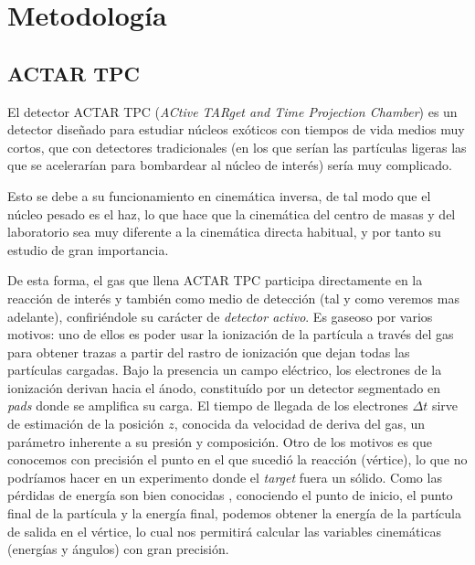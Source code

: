 \section{Metodología}


\subsection{ACTAR TPC}

El detector ACTAR TPC (\textit{ACtive TARget and Time Projection Chamber}) es un detector diseñado para estudiar núcleos exóticos con tiempos de vida medios muy cortos, que con detectores tradicionales (en los que serían las partículas ligeras las que se acelerarían para bombardear al núcleo de interés) sería muy complicado.

Esto se debe a su funcionamiento en cinemática inversa, de tal modo que el núcleo pesado es el haz, lo que hace que la cinemática del centro de masas y del laboratorio sea muy diferente a la cinemática directa habitual, y por tanto su estudio de gran importancia. 

De esta forma, el gas que llena ACTAR TPC participa directamente en la reacción de interés y también como medio de detección (tal y como veremos mas adelante), confiriéndole su carácter de \textit{detector activo}. Es gaseoso por varios motivos: uno de ellos es poder usar la ionización de la partícula a través del gas para obtener trazas a partir del rastro de ionización que dejan todas las partículas cargadas. Bajo la presencia un campo eléctrico, los electrones de la ionización derivan hacia el ánodo, constituído por un detector segmentado en \textit{pads} donde se ampliﬁca su carga. El tiempo de llegada de los electrones $\Delta t$ sirve de estimación de la posición $z$, conocida da velocidad de deriva del gas, un parámetro inherente a su presión y composición. Otro de los motivos es que conocemos con precisión el punto en el que sucedió la reacción (vértice), lo que no podríamos hacer en un experimento donde el \textit{target} fuera un sólido. Como las pérdidas de energía son bien conocidas \cite{ZIEGLER20101818}, conociendo el punto de inicio, el punto final de la partícula y la energía final, podemos obtener la energía de la partícula de salida en el vértice, lo cual nos permitirá calcular las variables cinemáticas (energías y ángulos) con gran precisión.


